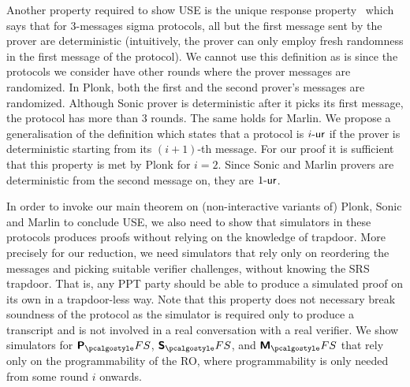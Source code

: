   Another property required to
show USE is the unique response property~\cite{C:Fischlin05} which says that for $3$-messages
sigma protocols, all but the first message sent by the prover are deterministic (intuitively,
the prover can only employ fresh randomness in the first message of the protocol). We cannot
use this definition as is since the protocols we consider have other rounds where the prover
messages are randomized. In Plonk, both the first and the second prover's messages are
randomized. Although Sonic prover is deterministic after it picks its first message, the
protocol has more than $3$ rounds. The same holds for Marlin. We propose a generalisation of
the definition which states that a protocol is ${i\text{-}\mathsf{ur}}$ if the prover is deterministic starting
from its $(i + 1)$-th message. For our proof it is sufficient that this property is met by
Plonk for $i = 2$. Since Sonic and Marlin provers are deterministic from the second message on,
they are ${1\text{-}\mathsf{ur}}$.


  In order to invoke our main theorem on
(non-interactive variants of) Plonk, Sonic and Marlin to conclude USE, we also need to show
that simulators in these protocols produces proofs without relying on the knowledge of
trapdoor. More precisely for our reduction, we need simulators that rely only on reordering the
messages and picking suitable verifier challenges, without knowing the SRS trapdoor.  That is,
any PPT party should be able to produce a simulated proof on its own in a trapdoor-less
way. Note that this property does not necessary break soundness of the protocol as the
simulator is required only to produce a transcript and is not involved in a real conversation
with a real verifier. We show simulators for $\plonkprotfs$, $\sonicprotfs$, and
$\marlinprotfs$ that rely only on the programmability of the RO, where programmability is only
needed from some round $i$ onwards.    

